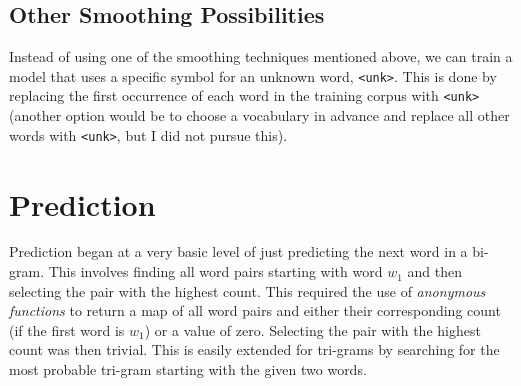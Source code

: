 \subsection{Other Smoothing Possibilities}\label{sec:otherSmoothing}

Instead of using one of the smoothing techniques mentioned above, we can train a model that uses a specific symbol for an unknown word, \lstinline!<unk>!. This is done by replacing the first occurrence of each word in the training corpus with \lstinline!<unk>! (another option would be to choose a vocabulary in advance and replace all other words with \lstinline!<unk>!, but I did not pursue this).


\section{Prediction}



Prediction began at a very basic level of just predicting the next word in a bi-gram. This involves finding all word pairs starting with word $w_{1}$ and then selecting the pair with the highest count. This required the use of \textit{anonymous functions} to return a map of all word pairs and either their corresponding count (if the first word is $w_{1}$) or a value of zero. Selecting the pair with the highest count was then trivial. This is easily extended for tri-grams by searching for the most probable tri-gram starting with the given two words.

%

